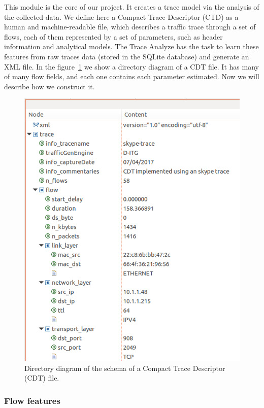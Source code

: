 This module is the core of our project. It creates a trace model via the analysis of the collected data. We define here a Compact Trace Descriptor (CTD) as a human and machine-readable file, which describes a traffic trace through a set of flows, each of them represented by a set of parameters, such as header information and analytical models.  The Trace Analyze has the task to learn these features from raw traces data (stored in the SQLite database) and generate an XML file.  In the figure~\ref{fig:CTD-diagram} we show a directory diagram of a CDT file. It has many of many flow fields, and each one contains each parameter estimated. Now we will describe how we construct it. 

\begin{figure}[ht!]
        \centering
        \includegraphics[width=\linewidth]{figures/cdt1}
        \caption{Directory diagram of the schema of a Compact Trace Descriptor (CDT) file.}
    \label{fig:CTD-diagram}
\end{figure}

\subsubsection{Flow features}

